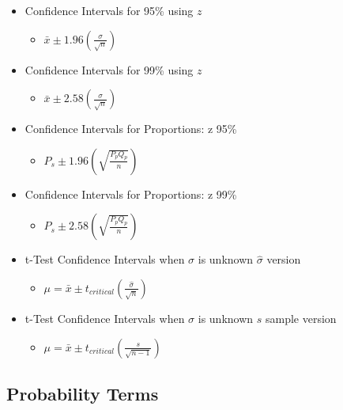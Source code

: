 \documentclass[]{article}
\begin{document}
\begin{itemize}
\itemsep1pt\parskip0pt
\item
  Confidence Intervals for 95\% using $z$

  \begin{itemize}
  \itemsep1pt\parskip0pt
  \item
    $\bar{x} \pm 1.96(\frac{\sigma}{\sqrt{n}})$
  \end{itemize}
\item
  Confidence Intervals for 99\% using $z$

  \begin{itemize}
  \itemsep1pt\parskip0pt
  \item
    $\bar{x} \pm 2.58(\frac{\sigma}{\sqrt{n}})$
  \end{itemize}
\item
  Confidence Intervals for Proportions: z 95\%

  \begin{itemize}
  \itemsep1pt\parskip0pt
  \item
    $P_s \pm 1.96(\sqrt{\frac{P_p Q_p}{n}})$
  \end{itemize}
\item
  Confidence Intervals for Proportions: z 99\%

  \begin{itemize}
  \itemsep1pt\parskip0pt
  \item
    $P_s \pm 2.58(\sqrt{\frac{P_p Q_p}{n}})$
  \end{itemize}
\item
  t-Test Confidence Intervals when $\sigma$ is unknown $\hat{\sigma}$
  version

  \begin{itemize}
  \itemsep1pt\parskip0pt
  \item
    $\mu = \bar{x} \pm t_{critical}(\frac{\hat{\sigma}}{\sqrt{n}})$
  \end{itemize}
\item
  t-Test Confidence Intervals when $\sigma$ is unknown $s$ sample
  version

  \begin{itemize}
  \itemsep1pt\parskip0pt
  \item
    $\mu = \bar{x} \pm t_{critical}(\frac{s}{\sqrt{n-1}})$
  \end{itemize}
\end{itemize}

\subsection{Probability Terms}\label{probability-terms}
\end{document}

